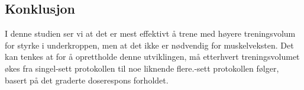 \documentclass[
]{book}
\begin{document}
\hypertarget{konklusjon}{%
\subsection{Konklusjon}\label{konklusjon}}

I denne studien ser vi at det er mest effektivt å trene med høyere treningsvolum for styrke i underkroppen, men at det ikke er nødvendig for muskelveksten. Det kan tenkes at for å oprettholde denne utviklingen, må etterhvert treningsvolumet økes fra singel-sett protokollen til noe liknende flere.-sett protokollen følger, basert på det graderte doserespons forholdet.

  
\end{document}

